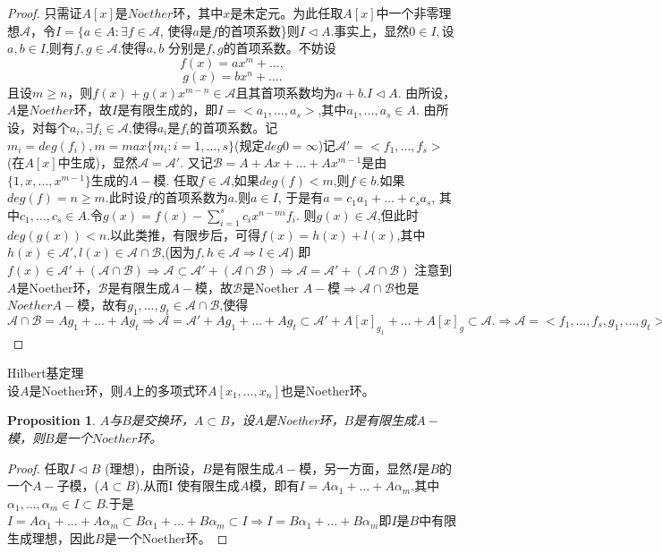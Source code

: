 \documentclass[UTF8]{article}
\newtheorem{prop}{Proposition}[section]
\begin{document}
\begin{proof}
	只需证$A[x]$是$Noether$环，其中$x$是未定元。为此任取$A[x]$中一个非零理想$\mathscr{A}$，令$I=\{a\in A:\exists f\in \mathscr{A}$, 使得$a$是$f$的首项系数\}则$I\vartriangleleft A$.事实上，显然$0\in I,$设$a,b\in I$,则有$f,g\in\mathscr{A}$.使得$a,b$ 分别是$f,g$的首项系数。不妨设
	$$f(x)=ax^m+\ldots,$$
	$$g(x)=bx^n+\ldots.$$
	且设$m\geqslant n$，则$f(x)+g(x)x^{m-n}\in \mathscr{A}$且其首项系数均为$a+b.{ }I\vartriangleleft A$. 由所设，$A$是$Noether$环，故$I$是有限生成的，即$I=<a_1,\ldots,a_s>$,其中$a_1,\ldots,a_s\in A.$
	由所设，对每个$a_i,\exists f_i\in\mathscr{A}$,使得$a_i$是$f_i$的首项系数。记$m_i=deg(f_i),m=max\{m_i:i=1,\ldots,s\}$(规定$deg0=\infty$)记$\mathscr{A}'=<f_1,\ldots,f_s>$(在$A[x]$中生成)，显然$\mathscr{A}=\mathscr{A}'.$
	又记$\mathscr{B}=A+Ax+\ldots+Ax^{m-1}$是由$\{1,x,\ldots,x^{m-1}\}$生成的$A-$模.
	任取$f\in\mathscr{A}$,如果$deg(f)<m$,则$f\in b$.如果$deg(f)=n\geq m$.此时设$f$的首项系数为$a$.则$a\in I$, 于是有$a=c_1a_1+\ldots+c_sa_s$, 其中$c_1,\ldots,c_s\in A$.令$g(x)=f(x)-\sum\limits_{i=1}^s{c_ix^{n-mi}f_i}$.
	则$g(x)\in\mathscr{A}$,但此时$deg(g(x))<n$.以此类推，有限步后，可得$f(x)=h(x)+l(x)$,其中$h(x)\in \mathscr{A}',l(x)\in\mathscr{A}\cap\mathscr{B}$,(因为$f,h\in\mathscr{A}\Rightarrow l\in\mathscr{A}$)
	即$f(x)\in\mathscr{A}'+(\mathscr{A}\cap\mathscr{B})\Rightarrow\mathscr{A}\subset\mathscr{A}'+(\mathscr{A}\cap\mathscr{B})\Rightarrow\mathscr{A}=\mathscr{A}'+(\mathscr{A}\cap\mathscr{B})$
	注意到$A$是Noether环，$\mathscr{B}$是有限生成$A-$模，故$\mathscr{B}$是Noether $A-$模$\Rightarrow\mathscr{A}\cap\mathscr{B}$也是$Noether A-$模，故有$g_1,\ldots,g_t\in\mathscr{A}\cap\mathscr{B}$,使得
	$\mathscr{A}\cap\mathscr{B}=Ag_1+\ldots+Ag_t\Rightarrow\mathscr{A}=\mathscr{A}'+Ag_1+\ldots+Ag_t\subset\mathscr{A}'+A[x]_{g_1}+\ldots+A[x]_g\subset\mathscr{A}.\Rightarrow\mathscr{A}=<f_1,\ldots,f_s,g_1,\ldots,g_t>.$
\end{proof}
Hilbert基定理\\
设$A$是Noether环，则$A$上的多项式环$A[x_1,\ldots,x_n]$也是Noether环。
\begin{prop}
	$A$与$B$是交换环，$A\subset B$，设$A$是Noether环，$B$是有限生成$A-$模，则$B$是一个$Noether$环。
\end{prop}
\begin{proof}
	任取$I\vartriangleleft B $ (理想)，由所设，$B$是有限生成$A-$模，另一方面，显然$I$是$B$的一个$A-$子模，($A\subset B$).从而I 使有限生成$A$模，即有$I=A\alpha_1+\ldots+A\alpha_m$.其中$\alpha_1,\ldots,\alpha_m\in I\subset B$.于是$I=A\alpha_1+\ldots+A\alpha_m\subset B\alpha_1+\ldots+B\alpha_m\subset I\Rightarrow I=B\alpha_1+\ldots+B\alpha_m$即$I$是$B$中有限生成理想，因此$B$是一个Noether环。
\end{proof}
\end{document}

